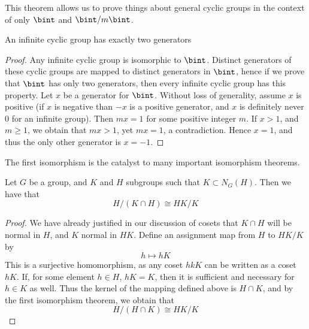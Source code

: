 This theorem allows us to prove things about general cyclic groups in the context of only $\bint$ and $\bint/m\bint$.

\begin{theorem}
    An infinite cyclic group has exactly two generators
\end{theorem}
\begin{proof}
    Any infinite cyclic group is isomorphic to $\bint$. Distinct generators of these cyclic groups are mapped to distinct generators in $\bint$, hence if we prove that $\bint$ has only two generators, then every infinite cyclic group has this property. Let $x$ be a generator for $\bint$. Without loss of generality, assume $x$ is positive (if $x$ is negative than $-x$ is a positive generator, and $x$ is definitely never $0$ for an infinite group). Then $mx = 1$ for some positive integer $m$. If $x > 1$, and $m \geq 1$, we obtain that $mx > 1$, yet $mx = 1$, a contradiction. Hence $x = 1$, and thus the only other generator is $x = -1$.
\end{proof}

The first isomorphism is the catalyst to many important isomorphism theorems.

\begin{theorem}  
    Let $G$ be a group, and $K$ and $H$ subgroups such that $K \subset N_G(H)$. Then we have that
    \[ H/(K \cap H) \cong HK/K \]
\end{theorem}
\begin{proof}
We have already justified in our discussion of cosets that $K \cap H$ will be normal in $H$, and $K$ normal in $HK$. Define an assignment map from $H$ to $HK/K$ by
%
\[ h \mapsto hK \]
%
This is a surjective homomorphism, as any coset $hkK$ can be written as a coset $hK$. If, for some element $h \in H$, $hK = K$, then it is sufficient and necessary for $h \in K$ as well. Thus the kernel of the mapping defined above is $H \cap K$, and by the first isomorphism theorem, we obtain that
%
\[ H/(H \cap K) \cong HK/K \]
\end{proof}

